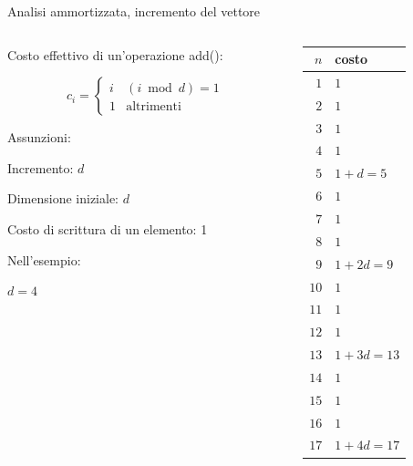 \begin{frame}{Analisi ammortizzata, incremento del vettore}

\vspace{-9pt}
\begin{columns}[T]
\begin{column}{0.6\textwidth}
\alert{Costo effettivo di un'operazione \textsf{add}()}:

\[
c_i = \begin{cases} 
     i & \textrm{$(i \bmod d) = 1$}\\
     1 & \textrm{altrimenti}
  \end{cases}
\]

\bigskip
Assunzioni:
\BI
\item Incremento: $d$
\item Dimensione iniziale: $d$
\item Costo di scrittura di un elemento: 1
\EI

\bigskip
Nell'esempio:
\BI
\item $d=4$
\EI



\end{column}
\hfill
\begin{column}{0.30\textwidth}
{\footnotesize
\begin{tabular}{|r|l|}
\hline
$n$ & costo \\
\hline
$1$ & $1$ \\
$2$ & $1$ \\
$3$ & $1$ \\
$4$ & $1$ \\
$5$ & $1 + d = 5$\\
$6$ & $1$ \\
$7$ & $1$ \\
$8$ & $1$ \\
$9$ & $1 + 2d = 9$ \\
$10$ & $1$ \\
$11$ & $1$ \\
$12$ & $1$ \\
$13$ & $1 + 3d = 13$ \\
$14$ & $1$ \\
$15$ & $1$ \\
$16$ & $1$ \\
$17$ & $1 + 4d = 17$ \\
\hline
\end{tabular}
}
\end{column}
\end{columns}

\end{frame}

